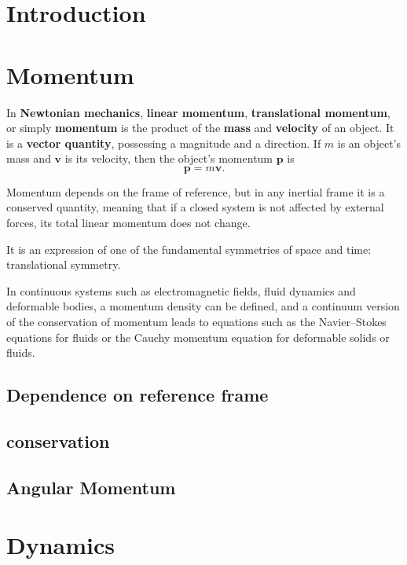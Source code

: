 \section{Introduction}
	\subsection{}

\section{Momentum}
In \textbf{Newtonian mechanics}, \textbf{linear momentum}, \textbf{translational momentum}, or simply \textbf{momentum} is the product of the \textbf{mass} and \textbf{velocity} of an object. It is a \textbf{vector quantity}, possessing a magnitude and a direction. If $m$ is an object's mass and $\mathbf{v}$ is its velocity, then the object's momentum $\mathbf{p}$ is
\[
\mathbf{p} = m\mathbf{v}.
\]

Momentum depends on the frame of reference, but in any inertial frame it is a conserved quantity, meaning that if a closed system is not affected by external forces, its total linear momentum does not change.

It is an expression of one of the fundamental symmetries of space and time: translational symmetry.

In continuous systems such as electromagnetic fields, fluid dynamics and deformable bodies, a momentum density can be defined, and a continuum version of the conservation of momentum leads to equations such as the Navier–Stokes equations for fluids or the Cauchy momentum equation for deformable solids or fluids.

	\subsection{Dependence on reference frame}
	
	\subsection{conservation}

	\subsection{Angular Momentum}

\section{Dynamics}
